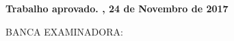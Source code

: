 % 
%


\begin{folhadeaprovacao}
	\begin{center}
		
		{\ABNTEXchapterfont\large\MakeUppercase{\imprimirautor}}
		
		\vspace{30pt}
		
		\vspace*{\fill}\vspace*{\fill}
		
		\begin{center}
			
			{\ABNTEXchapterfont\bfseries\large\MakeUppercase{\imprimirtitulo}}
			
		\end{center}
		
		\vspace*{\fill}
		
		\hspace{.45\textwidth}
		
		\begin{flushright}
			\begin{minipage}{.5\textwidth}
				\imprimirpreambulo	
			\end{minipage}
		\end{flushright}
		
		\vspace*{\fill}
		
	\end{center}
	
	\vspace{10pt}
	
	\begin{flushleft}
		
	{\bfseries Trabalho aprovado. \imprimirlocal, 24 de Novembro de 2017}
		
	\end{flushleft}
	
	\vspace{10pt}
	
	\begin{flushleft}
		BANCA EXAMINADORA:
		

\end{flushleft}
\end{folhadeaprovacao}
